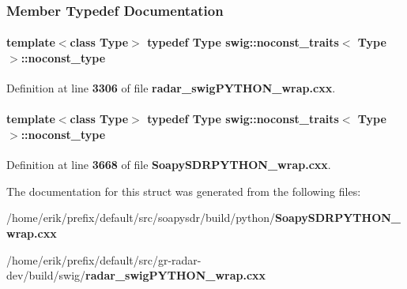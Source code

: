 \subsubsection{Member Typedef Documentation}
\paragraph[{noconst\+\_\+type}]{\setlength{\rightskip}{0pt plus 5cm}template$<$class Type$>$ typedef Type {\bf swig\+::noconst\+\_\+traits}$<$ Type $>$\+::{\bf noconst\+\_\+type}}\label{structswig_1_1noconst__traits_a372428d7bd7dc7ea86f03714159d6354}


Definition at line {\bf 3306} of file {\bf radar\+\_\+swig\+P\+Y\+T\+H\+O\+N\+\_\+wrap.\+cxx}.

\paragraph[{noconst\+\_\+type}]{\setlength{\rightskip}{0pt plus 5cm}template$<$class Type$>$ typedef Type {\bf swig\+::noconst\+\_\+traits}$<$ Type $>$\+::{\bf noconst\+\_\+type}}\label{structswig_1_1noconst__traits_a372428d7bd7dc7ea86f03714159d6354}


Definition at line {\bf 3668} of file {\bf Soapy\+S\+D\+R\+P\+Y\+T\+H\+O\+N\+\_\+wrap.\+cxx}.



The documentation for this struct was generated from the following files\+:\begin{DoxyCompactItemize}
\item 
/home/erik/prefix/default/src/soapysdr/build/python/{\bf Soapy\+S\+D\+R\+P\+Y\+T\+H\+O\+N\+\_\+wrap.\+cxx}\item 
/home/erik/prefix/default/src/gr-\/radar-\/dev/build/swig/{\bf radar\+\_\+swig\+P\+Y\+T\+H\+O\+N\+\_\+wrap.\+cxx}\end{DoxyCompactItemize}
